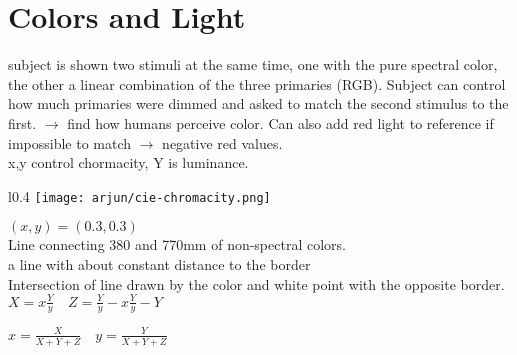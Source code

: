 \section{Colors and Light}
 subject is shown two stimuli at the same time, one with the pure spectral color, the other a linear combination of the three primaries (RGB). Subject can control how much primaries were dimmed and asked to match the second stimulus to the first. $\rightarrow$ find how humans perceive color. Can also add red light to reference if impossible to match $\rightarrow$ negative red values. \\
 x,y control chormacity, Y is luminance. 
\begin{wrapfigure}[9]{l}{0.4\columnwidth} %
    \texttt{[image: arjun/cie-chromacity.png]}
\end{wrapfigure}
 $(x,y) = (0.3,0.3)$ \\
 Line connecting 380 and 770mm of non-spectral colors. \\
  a line with about constant distance to the border \\
 Intersection of line drawn by the color and white point with the opposite border. 
$X = x \frac{Y}{y} \quad Z = \frac{Y}{y} - x \frac{Y}{y} - Y$

$x = \frac{X}{X + Y + Z} \quad y = \frac{Y}{X + Y + Z}$

